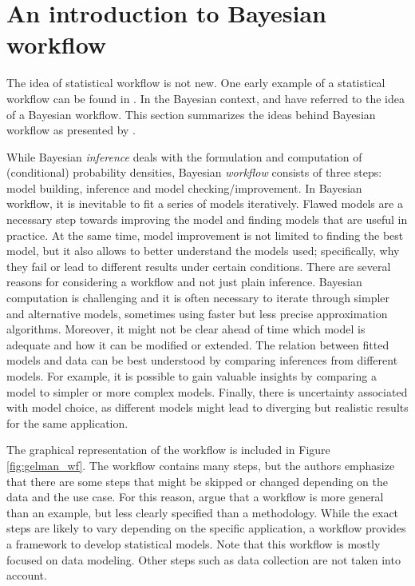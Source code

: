 \section{An introduction to Bayesian workflow}

The idea of statistical workflow is not new.
One early example of a statistical workflow can be found in \cite{box_science_1976}.
In the Bayesian context, \cite{gabry_visualization_2019} and \cite{betancourt_towards_2020} have referred to the idea of a Bayesian workflow.
This section summarizes the ideas behind Bayesian workflow as presented by \cite{gelman_bayesian_2020}.

While Bayesian \textit{inference} deals with the formulation and computation of (conditional) probability densities, Bayesian \textit{workflow} consists of three steps: model building, inference and model checking/improvement.
In Bayesian workflow, it is inevitable to fit a series of models iteratively.
Flawed models are a necessary step towards improving the model and finding models that are useful in practice.
At the same time, model improvement is not limited to finding the best model, but it also allows to better understand the models used; specifically, why they fail or lead to different results under certain conditions.
There are several reasons for considering a workflow and not just plain inference.
Bayesian computation is challenging and it is often necessary to iterate through simpler and alternative models, sometimes using faster but less precise approximation algorithms.
Moreover, it might not be clear ahead of time which model is adequate and how it can be modified or extended.
The relation between fitted models and data can be best understood by comparing inferences from different models.
For example, it is possible to gain valuable insights by comparing a model to simpler or more complex models.
Finally, there is uncertainty associated with model choice, as different models might lead to diverging but realistic results for the same application.

The graphical representation of the workflow is included in Figure \ref{fig:gelman_wf}.
The workflow contains many steps, but the authors emphasize that there are some steps that might be skipped or changed depending on the data and the use case.
For this reason, \cite{gelman_bayesian_2020} argue that a workflow is more general than an example, but less clearly specified than a methodology.
While the exact steps are likely to vary depending on the specific application, a workflow provides a framework to develop statistical models.
Note that this workflow is mostly focused on data modeling.
Other steps such as data collection are not taken into account.


